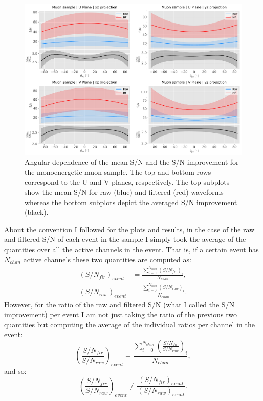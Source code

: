 \begin{figure}[t]
	\centering
	\includegraphics[width=0.9\linewidth]{Images/Matched_Filter/larsoft_muon_angular.pdf}
	\caption[Angular dependence of the mean S/N and the S/N improvement for the monoenergetic muon sample.]{Angular dependence of the mean S/N and the S/N improvement for the monoenergetic muon sample. The top and bottom rows correspond to the U and V planes, respectively. The top subplots show the mean S/N for raw (blue) and filtered (red) waveforms whereas the bottom subplots depict the averaged S/N improvement (black).}
	\label{fig:angular_muon}
\end{figure}

About the convention I followed for the plots and results, in the case of the raw and filtered S/N of each event in the sample I simply took the average of the quantities over all the active channels in the event. That is, if a certain event has $N_{chan}$ active channels these two quantities are computed as:
\begin{equation}
\begin{split}
\left(S/N_{fir}\right)_{event} &= \frac{\sum_{i=0}^{N_{chan}} \left(S/N_{fir}\right)_{i}}{N_{chan}},\\
\left(S/N_{raw}\right)_{event} &= \frac{\sum_{i=0}^{N_{chan}} \left(S/N_{raw}\right)_{i}}{N_{chan}}.
\end{split}
\end{equation}
However, for the ratio of the raw and filtered S/N (what I called the S/N improvement) per event I am not just taking the ratio of the previous two quantities but computing the average of the individual ratios per channel in the event:
\begin{equation}
\left(\frac{S/N_{fir}}{S/N_{raw}}\right)_{event} = \frac{\sum_{i=0}^{N_{chan}} \left(\frac{S/N_{fir}}{S/N_{raw}}\right)_{i}}{N_{chan}},
\end{equation}
and so:
\begin{equation}
\left(\frac{S/N_{fir}}{S/N_{raw}}\right)_{event}  \neq \frac{\left(S/N_{fir}\right)_{event}}{\left(S/N_{raw}\right)_{event}}.
\end{equation}

